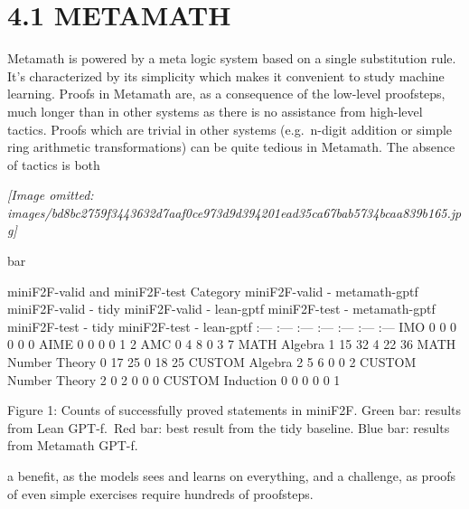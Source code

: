 \documentclass[
]{article}
\begin{document}
\section{4.1 METAMATH}\label{metamath}

Metamath is powered by a meta logic system based on a single
substitution rule. It's characterized by its simplicity which makes it
convenient to study machine learning. Proofs in Metamath are, as a
consequence of the low-level proofsteps, much longer than in other
systems as there is no assistance from high-level tactics. Proofs which
are trivial in other systems (e.g.~n-digit addition or simple ring
arithmetic transformations) can be quite tedious in Metamath. The
absence of tactics is both

\textit{[Image omitted: images/bd8bc2759f3443632d7aaf0ce973d9d394201ead35ca67bab5734bcaa839b165.jpg]}

bar

miniF2F-valid and miniF2F-test \textbar{} Category \textbar{}
miniF2F-valid - metamath-gptf \textbar{} miniF2F-valid - tidy \textbar{}
miniF2F-valid - lean-gptf \textbar{} miniF2F-test - metamath-gptf
\textbar{} miniF2F-test - tidy \textbar{} miniF2F-test - lean-gptf
\textbar{} \textbar{} :--- \textbar{} :--- \textbar{} :--- \textbar{}
:--- \textbar{} :--- \textbar{} :--- \textbar{} :--- \textbar{}
\textbar{} IMO \textbar{} 0 \textbar{} 0 \textbar{} 0 \textbar{} 0
\textbar{} 0 \textbar{} 0 \textbar{} \textbar{} AIME \textbar{} 0
\textbar{} 0 \textbar{} 0 \textbar{} 0 \textbar{} 1 \textbar{} 2
\textbar{} \textbar{} AMC \textbar{} 0 \textbar{} 4 \textbar{} 8
\textbar{} 0 \textbar{} 3 \textbar{} 7 \textbar{} \textbar{} MATH
Algebra \textbar{} 1 \textbar{} 15 \textbar{} 32 \textbar{} 4 \textbar{}
22 \textbar{} 36 \textbar{} \textbar{} MATH Number Theory \textbar{} 0
\textbar{} 17 \textbar{} 25 \textbar{} 0 \textbar{} 18 \textbar{} 25
\textbar{} \textbar{} CUSTOM Algebra \textbar{} 2 \textbar{} 5
\textbar{} 6 \textbar{} 0 \textbar{} 0 \textbar{} 2 \textbar{}
\textbar{} CUSTOM Number Theory \textbar{} 2 \textbar{} 0 \textbar{} 2
\textbar{} 0 \textbar{} 0 \textbar{} 0 \textbar{} \textbar{} CUSTOM
Induction \textbar{} 0 \textbar{} 0 \textbar{} 0 \textbar{} 0 \textbar{}
0 \textbar{} 1 \textbar{}

Figure 1: Counts of successfully proved statements in miniF2F. Green
bar: results from Lean GPT-f.~Red bar: best result from the tidy
baseline. Blue bar: results from Metamath GPT-f.

a benefit, as the models sees and learns on everything, and a challenge,
as proofs of even simple exercises require hundreds of proofsteps.
\end{document}
